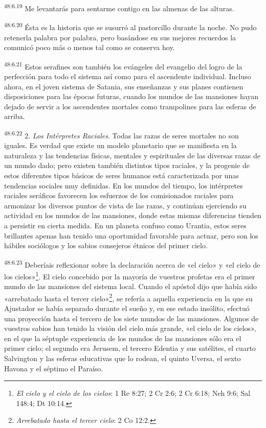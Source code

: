 \par
\textsuperscript{48:6.19} Me levantarás para sentarme contigo en las almenas de las alturas.

\par
\textsuperscript{48:6.20} Ésta es la historia que se susurró al pastorcillo durante la noche. No pudo retenerla palabra por palabra, pero basándose en sus mejores recuerdos la comunicó poco más o menos tal como se conserva hoy.

\par
\textsuperscript{48:6.21} Estos serafines son también los evángeles del evangelio del logro de la perfección para todo el sistema así como para el ascendente individual. Incluso ahora, en el joven sistema de Satania, sus enseñanzas y sus planes contienen disposiciones para las épocas futuras, cuando los mundos de las mansiones hayan dejado de servir a los ascendentes mortales como trampolines para las esferas de arriba.

\par
\textsuperscript{48:6.22} 2. \textit{Los Intérpretes Raciales}. Todas las razas de seres mortales no son iguales. Es verdad que existe un modelo planetario que se manifiesta en la naturaleza y las tendencias físicas, mentales y espirituales de las diversas razas de un mundo dado; pero existen también distintos tipos raciales, y la progenie de estos diferentes tipos básicos de seres humanos está caracterizada por unas tendencias sociales muy definidas. En los mundos del tiempo, los intérpretes raciales seráficos favorecen los esfuerzos de los comisionados raciales para armonizar los diversos puntos de vista de las razas, y continúan ejerciendo su actividad en los mundos de las mansiones, donde estas mismas diferencias tienden a persistir en cierta medida. En un planeta confuso como Urantia, estos seres brillantes apenas han tenido una oportunidad favorable para actuar, pero son los hábiles sociólogos y los sabios consejeros étnicos del primer cielo.

\par
\textsuperscript{48:6.23} Deberíais reflexionar sobre la declaración acerca de «el cielo» y «el cielo de los cielos»\footnote{\textit{El cielo y el cielo de los cielos}: 1 Re 8:27; 2 Cr 2:6; 2 Cr 6:18; Neh 9:6; Sal 148:4; Dt 10:14.}. El cielo concebido por la mayoría de vuestros profetas era el primer mundo de las mansiones del sistema local. Cuando el apóstol dijo que había sido «arrebatado hasta el tercer cielo»\footnote{\textit{Arrebatado hasta el tercer cielo}: 2 Co 12:2.}, se refería a aquella experiencia en la que su Ajustador se había separado durante el sueño y, en ese estado insólito, efectuó una proyección hasta el tercero de los siete mundos de las mansiones. Algunos de vuestros sabios han tenido la visión del cielo más grande, «el cielo de los cielos», en el que la séptuple experiencia de los mundos de las mansiones sólo era el primer cielo; el segundo era Jerusem, el tercero Edentia y sus satélites, el cuarto Salvington y las esferas educativas que lo rodean, el quinto Uversa, el sexto Havona y el séptimo el Paraíso.

